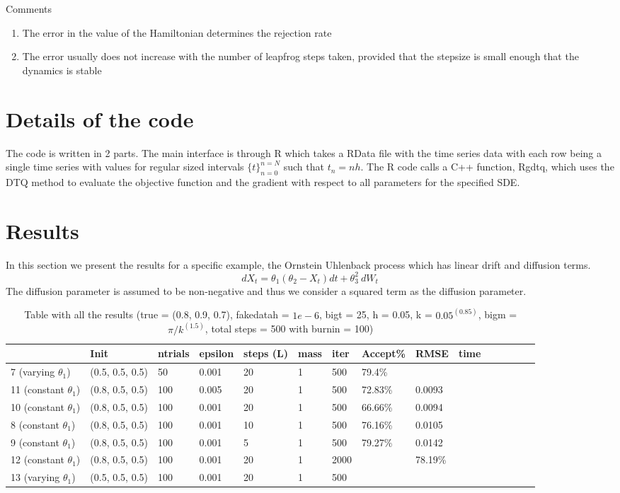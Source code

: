 \documentclass[a4paper,11pt]{article}
\begin{document}
Comments
\begin{enumerate}
\item The error in the value of the Hamiltonian determines the rejection rate
\item The error usually does not increase with the number of leapfrog steps taken, provided that the stepsize is small enough that the dynamics is stable
\end{enumerate}

\section{Details of the code}
The code is written in 2 parts. The main interface is through R which takes a RData file with the time series data with each row being a single time series with values for regular sized intervals $\{t\}_{n=0}^{n=N}$ such that $t_n = nh$. The R code calls a C++ function, Rgdtq, which uses the DTQ method to evaluate the objective function and the gradient with respect to all parameters for the specified SDE.

\section{Results}
In this section we present the results for a specific example, the Ornstein Uhlenback process which has linear drift and diffusion terms. 
\begin{equation}
dX_t = \theta_1 (\theta_2 - X_t)dt + \theta_3^2 \: dW_t
\end{equation}
The diffusion parameter is assumed to be non-negative and thus we consider a squared term as the diffusion parameter.

\begin{table}[H]
\centering
\caption{Table with all the results (true = (0.8, 0.9, 0.7), fakedatah = $1e-6$, bigt = 25, h = 0.05, k = $0.05^{(0.85)}$, bigm = $\pi / k^{(1.5)}$, total steps = 500 with burnin = 100)}
\begin{tabular}{|l|l|l|l|l|l|l|l|l|l|l|l|l|l|l|} 
\hline 
 & Init & ntrials & epsilon & steps (L) & mass & iter & Accept\% & RMSE & time \\ \hline
7 (varying $\theta_1$) & (0.5, 0.5, 0.5)  & 50 & 0.001 & 20 & 1 & 500 & 79.4\% & & \\
11 (constant $\theta_1$) & (0.8, 0.5, 0.5) & 100 & 0.005 & 20 & 1 & 500 & 72.83\% & 0.0093 & \\
10 (constant $\theta_1$) & (0.8, 0.5, 0.5) & 100 & 0.001 & 20 & 1 & 500 & 66.66\% & 0.0094 & \\
8 (constant $\theta_1$) & (0.8, 0.5, 0.5) & 100 & 0.001 & 10 & 1 & 500 & 76.16\% & 0.0105 & \\
9 (constant $\theta_1$) & (0.8, 0.5, 0.5) & 100 & 0.001 & 5 & 1 & 500 & 79.27\% & 0.0142 & \\
12 (constant $\theta_1$) & (0.8, 0.5, 0.5) & 100 & 0.001 & 20 & 1 & 2000 & & 78.19\% & \\
13 (varying $\theta_1$) & (0.5, 0.5, 0.5) & 100 & 0.001 & 20 & 1 & 500 & & & \\
\hline
\end{tabular}
\end{table}
\end{document}

